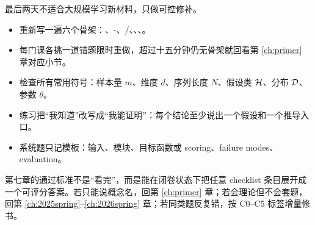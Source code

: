 最后两天不适合大规模学习新材料，只做可控修补。

\begin{itemize}
  \item 重新写一遍六个骨架：、-、/、、、。
  \item 每门课各挑一道错题限时重做，超过十五分钟仍无骨架就回看第 \ref{ch:primer} 章对应小节。
  \item 检查所有常用符号：样本量 \(m\)、维度 \(d\)、序列长度 \(N\)、假设类 \(\mathcal{H}\)、分布 \(\mathcal{D}\)、参数 \(\theta\)。
  \item 练习把“我知道”改写成“我能证明”：每个结论至少说出一个假设和一个推导入口。
  \item 系统题只记模板：输入、模块、目标函数或 scoring、failure modes、evaluation。
\end{itemize}

\begin{checkpoint}
第七章的通过标准不是“看完”，而是能在闭卷状态下把任意 checklist 条目展开成一个可评分答案。若只能说概念名，回第 \ref{ch:primer} 章；若会理论但不会套题，回第 \ref{ch:2025spring}--\ref{ch:2026spring} 章；若同类题反复错，按 C0--C5 标签增量修书。
\end{checkpoint}
